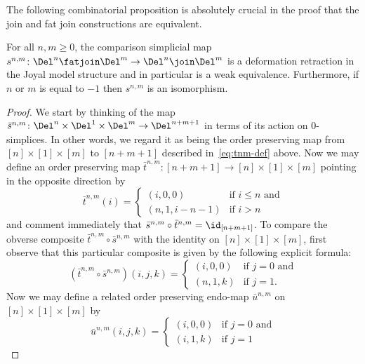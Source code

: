 The following combinatorial proposition is absolutely crucial in the proof that the join and fat join constructions are equivalent.

  \begin{prop}\label{prop:join-fatjoin-equiv-simplices}
    For all $n,m\geq 0$, the comparison simplicial map $s^{n,m}\colon\Del^n\fatjoin\Del^m\to\Del^n\join\Del^m$ is a deformation retraction in the Joyal model structure and in particular is a weak equivalence. Furthermore, if $n$ or $m$ is equal to $-1$ then $s^{n,m}$ is an isomorphism.
  \end{prop}

  \begin{proof}
    We start by thinking of the map $\bar{s}^{n,m}\colon \Del^n\times\Del^1\times\Del^m\to\Del^{n+m+1}$ in terms of its action on $0$-simplices. In other words, we regard it as being the order preserving map from $[n]\times[1]\times[m]$ to $[n+m+1]$ described in~\eqref{eq:tnm-def} above. Now we may define an order preserving map $\bar{t}^{n,m}\colon [n+m+1]\to [n]\times[1]\times[m]$ pointing in the opposite direction by 
    \begin{equation*}
      \bar{t}^{n,m}(i) =
      \begin{cases}
        (i,0,0) & \text{if $i\leq n$ and} \\
        (n,1,i-n-1) & \text{if $i>n$}
      \end{cases}
    \end{equation*}
    and comment immediately that $\bar{s}^{n,m}\circ \bar{t}^{n,m} = \id_{[n+m+1]}$. To compare the obverse composite $\bar{t}^{n,m}\circ \bar{s}^{n,m}$ with the identity on $[n]\times[1]\times[m]$, first observe that this particular composite is given by the following explicit formula:
    \begin{equation*}
      (\bar{t}^{n,m}\circ \bar{s}^{n,m})(i,j,k) = 
      \begin{cases}
        (i,0,0) & \text{if $j=0$ and} \\
        (n, 1, k) & \text{if $j=1$.}
      \end{cases}
    \end{equation*}
    Now we may define a related order preserving endo-map $\bar{u}^{n,m}$ on $[n]\times[1]\times[m]$ by
    \begin{equation*}
      \bar{u}^{n,m}(i,j,k) =
      \begin{cases}
        (i,0,0) & \text{if $j=0$ and} \\
        (i,1,k) & \text{if $j=1$}
      \end{cases}

\end{equation*}
\end{proof}

